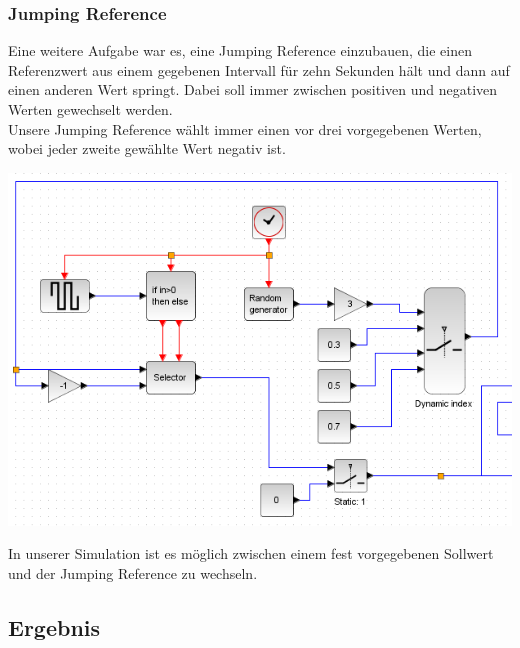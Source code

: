 \subsubsection{Jumping Reference}
Eine weitere Aufgabe war es, eine Jumping Reference einzubauen, die einen Referenzwert aus einem gegebenen Intervall für zehn Sekunden hält und dann auf einen anderen Wert springt. Dabei soll immer zwischen positiven und negativen Werten gewechselt werden. \\
Unsere Jumping Reference wählt immer einen vor drei vorgegebenen Werten, wobei jeder zweite gewählte Wert negativ ist. \\
\begin{center}
	\begin{minipage}{\linewidth}
	\centering
	\includegraphics[scale=0.7]{images/jumping_reference.png}
	\end{minipage}
\end{center}

In unserer Simulation ist es möglich zwischen einem fest vorgegebenen Sollwert und der Jumping Reference zu wechseln.

\subsection{Ergebnis}

